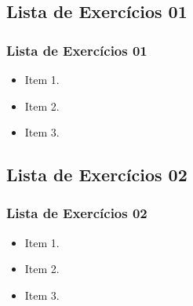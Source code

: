 \subsection[Lista de Exercícios 01]{Lista de Exercícios 01}\label{subsec:listas-lista01}



\begin{frame}[t]\frametitle{Lista de Exercícios 01}

  \begin{itemize}
    \justifying{}
    \setlength\itemsep{1em}
    \item Item 1.
    \item Item 2.
    \item Item 3.
  \end{itemize}

\end{frame}



\subsection[Lista de Exercícios 02]{Lista de Exercícios 02}\label{subsec:listas-lista02}



\begin{frame}[t]\frametitle{Lista de Exercícios 02}
  
  \begin{itemize}
    \justifying{}
    \setlength\itemsep{1em}
    \item Item 1.
    \item Item 2.
    \item Item 3.
  \end{itemize}
  
\end{frame}
